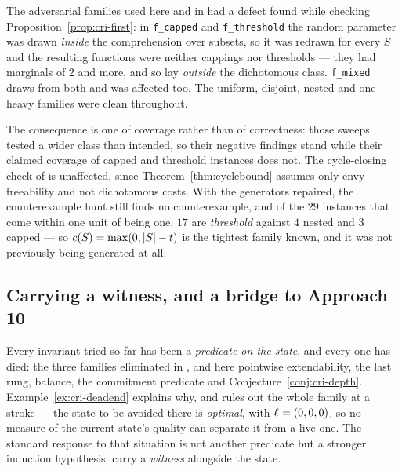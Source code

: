 \begin{remark}
\label{rem:cri-genbug}
The adversarial families used here and in  had a defect
found while checking Proposition~\ref{prop:cri-first}: in \texttt{f\_capped} and
\texttt{f\_threshold} the random parameter was drawn \emph{inside} the
comprehension over subsets, so it was redrawn for every $S$ and the resulting
functions were neither cappings nor thresholds --- they had marginals of $2$ and
more, and so lay \emph{outside} the dichotomous class. \texttt{f\_mixed} draws
from both and was affected too. The uniform, disjoint, nested and one-heavy
families were clean throughout.

The consequence is one of coverage rather than of correctness: those sweeps
tested a wider class than intended, so their negative findings stand while their
claimed coverage of capped and threshold instances does not. The
cycle-closing check of  is unaffected, since
Theorem~\ref{thm:cyclebound} assumes only envy-freeability and not dichotomous
costs. With the generators repaired, the counterexample hunt still finds no
counterexample, and of the $29$ instances that come within one unit of being one,
$17$ are \emph{threshold} against $4$ nested and $3$ capped --- so
$c(S) = \max(0, \left\lvert S\right\rvert - t)$ is the tightest family known, and it was not
previously being generated at all.
\end{remark}

\subsection{Carrying a witness, and a bridge to Approach 10}
\label{sec:cri-witness}

Every invariant tried so far has been a \emph{predicate on the state}, and every
one has died: the three families eliminated in , and here
pointwise extendability, the last rung, balance, the commitment predicate and
Conjecture~\ref{conj:cri-depth}. Example~\ref{ex:cri-deadend} explains why, and
rules out the whole family at a stroke --- the state to be avoided there is
\emph{optimal}, with $\ell_{} = (0,0,0)$, so no measure of the current state's
quality can separate it from a live one. The standard response to that situation
is not another predicate but a stronger induction hypothesis: carry a
\emph{witness} alongside the state.

